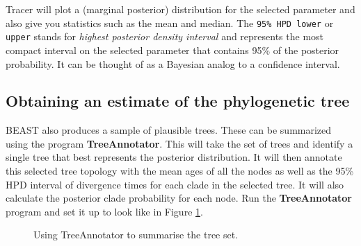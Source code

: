 \documentclass{article}
\begin{document}
Tracer will plot a (marginal posterior) distribution for the selected parameter and also give you statistics such as the mean and median. The \texttt{95\% HPD lower} or \texttt {upper} stands for {\it highest posterior density interval} and represents the most compact interval on the selected parameter that contains 95\% of the posterior probability. It can be thought of as a Bayesian analog to a confidence interval. 

\subsection*{Obtaining an estimate of the phylogenetic tree}

BEAST also produces a sample of plausible trees. 
These can be summarized using the program {\bf TreeAnnotator}. This will take the set of trees and identify a single tree that best represents the posterior distribution. It will then annotate this selected tree topology with the mean ages of all the
nodes as well as the 95\% HPD interval of divergence times for each clade in the selected tree. It will also calculate the posterior clade probability for each
node. Run the {\bf TreeAnnotator} program and set it up to look like in Figure \ref{fig.TreeAnnotator}.

\begin{figure}
\begin{center}


\end{center}
\caption{\label{fig.TreeAnnotator} Using TreeAnnotator to summarise the tree set.}
\end{figure}
\end{document}

